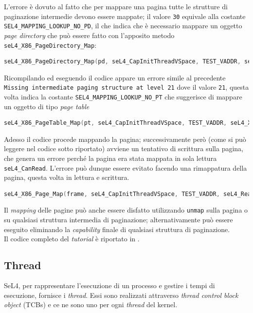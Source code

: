 L'errore è dovuto al fatto che per mappare una pagina tutte le strutture di paginazione intermedie devono essere mappate; il valore \texttt{30} equivale alla costante \texttt{SEL4\_MAPPING\_LOOKUP\_NO\_PD}, il che indica che è necessario mappare un oggetto \textit{page directory} che può essere fatto con l'apposito metodo \texttt{seL4\_X86\_PageDirectory\_Map}:
\begin{lstlisting}[language=C++]
seL4_X86_PageDirectory_Map(pd, seL4_CapInitThreadVSpace, TEST_VADDR, seL4_X86_Default_VMAttributes);
\end{lstlisting}

Ricompilando ed eseguendo il codice appare un errore simile al precedente \texttt{Missing intermediate paging structure at level 21} dove il valore \texttt{21}, questa volta indica la costante \texttt{SEL4\_MAPPING\_LOOKUP\_NO\_PT} che suggerisce di mappare un oggetto di tipo \textit{page table}
\begin{lstlisting}[language=C++]
seL4_X86_PageTable_Map(pt, seL4_CapInitThreadVSpace, TEST_VADDR, seL4_X86_Default_VMAttributes);
\end{lstlisting}

Adesso il codice procede mappando la pagina; successivamente però (come si può leggere nel codice sotto riportato) avviene un tentativo di scrittura sulla pagina, che genera un errore perché la pagina era stata mappata in sola lettura \texttt{seL4\_CanRead}. L'errore può dunque essere evitato facendo una rimappatura della pagina, questa volta in lettura e scrittura.
\begin{lstlisting}[language=C++]
seL4_X86_Page_Map(frame, seL4_CapInitThreadVSpace, TEST_VADDR, seL4_ReadWrite, seL4_X86_Default_VMAttributes);
\end{lstlisting}

Il \textit{mapping} delle pagine può anche essere disfatto utilizzando \texttt{unmap} sulla pagina o su qualsiasi struttura intermedia di paginazione; alternativamente può essere eseguito eliminando la \textit{capability} finale di qualsiasi struttura di paginazione.\\
Il codice completo del \textit{tutorial} è riportato in \cite{mapping}.

\subsection{Thread}
SeL4, per rappresentare l'esecuzione di un processo e gestire i tempi di esecuzione, fornisce i \textit{thread}. Essi sono realizzati attraverso \textit{thread control block object} (TCBs) e ce ne sono uno per ogni \textit{thread} del kernel.

